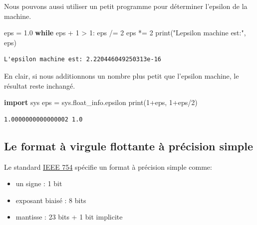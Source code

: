 \documentclass[
  letterpaper,
]{scrbook}
\newenvironment{Shaded}{\begin{snugshade}}{\end{snugshade}}
\newcommand{\BuiltInTok}[1]{\textcolor[rgb]{0.00,0.50,0.00}{#1}}
\newcommand{\ControlFlowTok}[1]{\textcolor[rgb]{0.00,0.44,0.13}{\textbf{#1}}}
\newcommand{\DecValTok}[1]{\textcolor[rgb]{0.25,0.63,0.44}{#1}}
\newcommand{\FloatTok}[1]{\textcolor[rgb]{0.25,0.63,0.44}{#1}}
\newcommand{\ImportTok}[1]{\textcolor[rgb]{0.00,0.50,0.00}{\textbf{#1}}}
\newcommand{\NormalTok}[1]{\textcolor[rgb]{0.00,0.44,0.13}{#1}}
\newcommand{\OperatorTok}[1]{\textcolor[rgb]{0.40,0.40,0.40}{#1}}
\newcommand{\StringTok}[1]{\textcolor[rgb]{0.25,0.44,0.63}{#1}}
\providecommand{\tightlist}{%
  \setlength{\itemsep}{0pt}\setlength{\parskip}{0pt}}\usepackage{longtable,booktabs,array}
\theoremstyle{plain}
\theoremstyle{definition}
\theoremstyle{definition}
\theoremstyle{remark}
\begin{document}
Nous pouvons aussi utiliser un petit programme pour déterminer l'epsilon
de la machine.

\begin{Shaded}
\begin{Highlighting}[]
\NormalTok{eps }\OperatorTok{=} \FloatTok{1.0}
\ControlFlowTok{while}\NormalTok{ eps }\OperatorTok{+} \DecValTok{1} \OperatorTok{\textgreater{}} \DecValTok{1}\NormalTok{:}
\NormalTok{    eps }\OperatorTok{/=} \DecValTok{2}
\NormalTok{eps }\OperatorTok{*=} \DecValTok{2}
\BuiltInTok{print}\NormalTok{(}\StringTok{"L\textquotesingle{}epsilon machine est:"}\NormalTok{, eps)}
\end{Highlighting}
\end{Shaded}

\begin{verbatim}
L'epsilon machine est: 2.220446049250313e-16
\end{verbatim}

En clair, si nous additionnons un nombre plus petit que l'epsilon
machine, le résultat reste inchangé.

\begin{Shaded}
\begin{Highlighting}[]
\ImportTok{import}\NormalTok{ sys}
\NormalTok{eps }\OperatorTok{=}\NormalTok{ sys.float\_info.epsilon}
\BuiltInTok{print}\NormalTok{(}\DecValTok{1}\OperatorTok{+}\NormalTok{eps, }\DecValTok{1}\OperatorTok{+}\NormalTok{eps}\OperatorTok{/}\DecValTok{2}\NormalTok{)}
\end{Highlighting}
\end{Shaded}

\begin{verbatim}
1.0000000000000002 1.0
\end{verbatim}

\hypertarget{le-format-uxe0-virgule-flottante-uxe0-pruxe9cision-simple}{%
\subsection{Le format à virgule flottante à précision
simple}\label{le-format-uxe0-virgule-flottante-uxe0-pruxe9cision-simple}}

Le standard \href{https://www.wikiwand.com/fr/IEEE\%20754}{IEEE 754}
spécifie un format à précision simple comme:

\begin{itemize}
\tightlist
\item
  un signe : 1 bit
\item
  exposant biaisé : 8 bits
\item
  mantisse : 23 bits + 1 bit implicite
\end{itemize}
\end{document}

